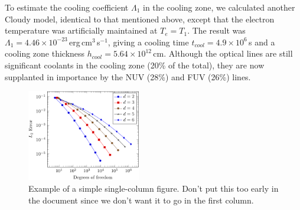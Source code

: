 \documentclass[10pt,letter,twoside]{rmaa-rho-class/rmac-rho}
\begin{document}
To estimate the cooling coefficient $\Lambda_1$ in the cooling zone, we calculated another Cloudy model, identical to that mentioned above, except that the electron temperature was artificially maintained at $T_{e} = T_1$. The result was $\Lambda_1 = 4.46 \times 10^{-23}$\,erg\,cm$^{3}$\,s$^{-1}$, giving a cooling time $t_{cool} = 4.9 \times 10^6$\,s and a cooling zone thickness $h_{cool} = 5.64 \times 10^{12}$\,cm. Although the  optical lines are still significant coolants in the cooling zone (20\% of the total), they are now supplanted in importance by the  NUV (28\%) and FUV (26\%) lines.
%
%
\begin{figure}[!t]
\centering
  \includegraphics[width=0.90\columnwidth,height=4.0cm]{figures/example2.pdf}
  \caption{Example of a simple single-column figure. Don't put this
    too early in the document since we don't want it to go in the
    first column.}
  \label{fig:simple}
\end{figure}







\end{document}
